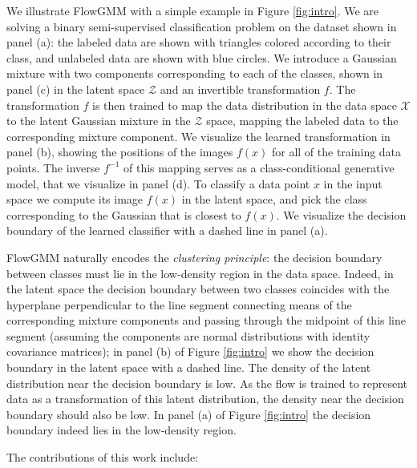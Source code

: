 \documentclass{article}
\newcommand{\method}{FlowGMM\xspace}
\newcommand{\mX}{\mathcal{X}}
\newcommand{\mZ}{\mathcal{Z}}
\begin{document}
We illustrate \method with a simple example in Figure \ref{fig:intro}.
We are solving a binary semi-supervised classification problem on the dataset shown 
in panel (a): the labeled data are shown with triangles colored according to their class, 
and unlabeled data are shown with blue circles. 
We introduce a Gaussian mixture with two components corresponding to each of the classes,
shown in panel (c) in the latent space $\mZ$ and an invertible transformation $f$.
The transformation $f$ is then trained to map the data distribution in the data space $\mX$ to the latent Gaussian mixture in the $\mZ$ space, mapping the labeled data to the corresponding mixture component.
We visualize the learned transformation in panel (b), showing the positions of the images
$f(x)$ for all of the training data points.
The inverse $f^{-1}$ of this mapping serves as a class-conditional generative model, that we visualize in panel (d).
To classify a data point $x$ in the input space we compute its image $f(x)$ in the latent space, and pick the class corresponding to the Gaussian that is closest to $f(x)$. 
We visualize the decision boundary of the learned classifier with a dashed line in panel (a).

\method naturally encodes the \textit{clustering principle}: the decision boundary
between classes must lie in the low-density region in the data space. 
Indeed, in the latent space
the decision boundary between two classes coincides with the hyperplane perpendicular to the line
segment connecting means of the corresponding mixture components and passing through the midpoint of this line segment (assuming the components are normal distributions with identity covariance matrices); in panel (b) of Figure \ref{fig:intro} we show the decision boundary in the latent space with a dashed line.
The density of the latent distribution near
the decision boundary is low. 
As the flow is trained to represent data as a transformation
of this latent distribution, the density near the decision boundary should
also be low. In panel (a) of Figure \ref{fig:intro} the decision
boundary indeed lies in the low-density region.



The contributions of this work include:
\end{document}

